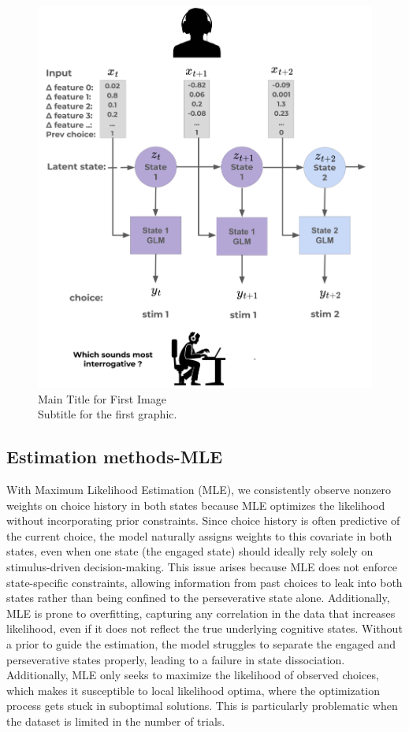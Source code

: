 \begin{figure}[H]
    \centering
    \includegraphics[width=12cm]{MainLayout/Images/chapter7/experiment_model.png}
    \caption{Main Title for First Image \\ \small Subtitle for the first graphic.}
    \label{fig:experiment_model}
\end{figure}


\subsection {Estimation methods-MLE} 
With Maximum Likelihood Estimation (MLE), we consistently observe nonzero weights on choice history in both states because MLE optimizes the likelihood without incorporating prior constraints. Since choice history is often predictive of the current choice, the model naturally assigns weights to this covariate in both states, even when one state (the engaged state) should ideally rely solely on stimulus-driven decision-making. This issue arises because MLE does not enforce state-specific constraints, allowing information from past choices to leak into both states rather than being confined to the perseverative state alone. Additionally, MLE is prone to overfitting, capturing any correlation in the data that increases likelihood, even if it does not reflect the true underlying cognitive states. Without a prior to guide the estimation, the model struggles to separate the engaged and perseverative states properly, leading to a failure in state dissociation. Additionally, MLE only seeks to maximize the likelihood of observed choices, which makes it susceptible to local likelihood optima, where the optimization process gets stuck in suboptimal solutions. This is particularly problematic when the dataset is limited in the number of trials.

